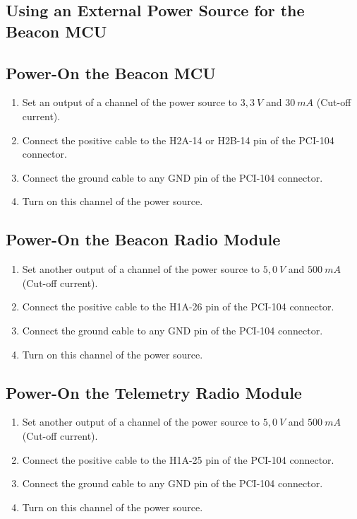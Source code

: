 \documentclass[12pt]{book}
\begin{document}
\begin{appendices}
\section{Using an External Power Source for the Beacon MCU}

\subsection{Power-On the Beacon MCU}

\begin{enumerate}
    \item Set an output of a channel of the power source to $3,3\ V$ and $30\ mA$ (Cut-off current).
    \item Connect the positive cable to the H2A-14 or H2B-14 pin of the PCI-104 connector.
    \item Connect the ground cable to any GND pin of the PCI-104 connector.
    \item Turn on this channel of the power source.
\end{enumerate}

\subsection{Power-On the Beacon Radio Module}

\begin{enumerate}
    \item Set another output of a channel of the power source to $5,0\ V$ and $500\ mA$ (Cut-off current).
    \item Connect the positive cable to the H1A-26 pin of the PCI-104 connector.
    \item Connect the ground cable to any GND pin of the PCI-104 connector.
    \item Turn on this channel of the power source.
\end{enumerate}

\subsection{Power-On the Telemetry Radio Module}

\begin{enumerate}
    \item Set another output of a channel of the power source to $5,0\ V$ and $500\ mA$ (Cut-off current).
    \item Connect the positive cable to the H1A-25 pin of the PCI-104 connector.
    \item Connect the ground cable to any GND pin of the PCI-104 connector.
    \item Turn on this channel of the power source.
\end{enumerate}


\end{appendices}
\end{document}

